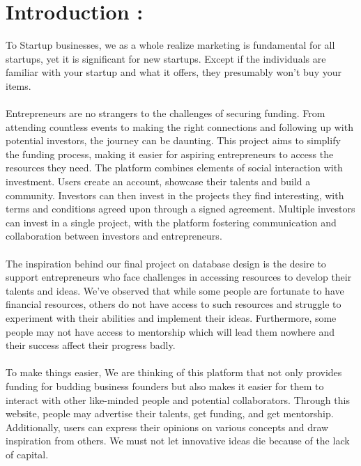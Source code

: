 
\chapter{Introduction :} %
\label{Chapter1}
To Startup businesses, we as a whole realize marketing is fundamental for all startups, yet it is significant for new startups. Except if the individuals are familiar with your startup and what it offers, they presumably won't buy your items.
\\\\
Entrepreneurs are no strangers to the challenges of securing funding. From attending countless events to making the right connections and following up with potential investors, the journey can be daunting. This project aims to simplify the funding process, making it easier for aspiring entrepreneurs to access the resources they need. The platform combines elements of social interaction with investment. Users create an account, showcase their talents and build a community. Investors can then invest in the projects they find interesting, with terms and conditions agreed upon through a signed agreement. Multiple investors can invest in a single project, with the platform fostering communication and collaboration between investors and entrepreneurs.
\\\\
The inspiration behind our final project on database design is the desire to support entrepreneurs who face challenges in accessing resources to develop their talents and ideas. We've observed that while some people are fortunate to have financial resources, others do not have access to such resources and struggle to experiment with their abilities and implement their ideas. Furthermore, some people may not have access to mentorship which will lead them nowhere and their success affect their progress badly.
\\\\
To make things easier, We are thinking of this platform that not only provides funding for budding business founders but also makes it easier for them to interact with other like-minded people and potential collaborators. Through this website, people may advertise their talents, get funding, and get mentorship. Additionally, users can express their opinions on various concepts and draw inspiration from others.  We must not let innovative ideas die because of the lack of capital.

